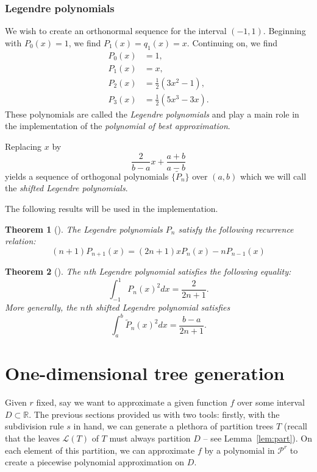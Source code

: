 \documentclass[11pt]{report}
\newtheorem{theorem}{Theorem}
\theoremstyle{definition}
\theoremstyle{remark}
\newcommand{\R}{\mathbb{R}}
\renewcommand{\L}{\mathcal{L}}
\renewcommand{\P}{\mathcal{P}}
\begin{document}
\subsection{Legendre polynomials}
We wish to create an orthonormal sequence for the interval $(-1,1)$. Beginning with $P_0(x) = 1$, we find $P_1(x) = q_1(x) = x$. Continuing on, we find 
\begin{align*}
  P_0(x) &= 1, \\
  P_1(x) &= x, \\
  P_2(x) &= \frac{1}{2}(3x^2-1), \\
  P_3(x) &= \frac{1}{2}(5x^3 - 3x).
\end{align*}
These polynomials are called the \emph{Legendre polynomials} and play a main role in the implementation of the \emph{polynomial of best approximation}.

Replacing $x$ by
\[
  \frac{2}{b-a} x + \frac{a+b}{a-b}
\]
yields a sequence of orthogonal polynomials $\{ \tilde P_n \}$ over $(a,b)$ which we will call the \emph{shifted Legendre polynomials}.

The following results will be used in the implementation.
\begin{theorem}[{\cite[p.~743]{legen}}]
  The Legendre polynomials $P_n$ satisfy the following recurrence relation:
  \[
    (n+1) P_{n+1}(x) = (2n+1) x P_n(x) - n P_{n-1}(x)
  \]
\end{theorem}
\begin{theorem}[{\cite[Ex.~3.28]{RY}}]
  The $n$th Legendre polynomial satisfies the following equality:
  \[
    \int_{-1}^1 P_n(x)^2 dx = \frac{2}{2n+1}.
  \]
  More generally, the $n$th shifted Legendre polynomial satisfies
  \[
    \int_a^b \tilde P_n(x)^2 dx = \frac{b-a}{2n+1}.
  \]
\end{theorem}


\chapter{One-dimensional tree generation}

Given $r$ fixed, say we want to approximate a given function $f$ over some interval $D \subset \R$. The previous sections provided us with two tools: firstly, with the subdivision rule $s$ in hand, we can generate a plethora of partition trees $T$ (recall that the leaves $\L(T)$ of $T$ must always partition $D$ -- see Lemma~\ref{lem:part}). On each element of this partition, we can approximate $f$ by a polynomial in $\P^r$ to create a piecewise polynomial approximation on $D$.
\end{document}
